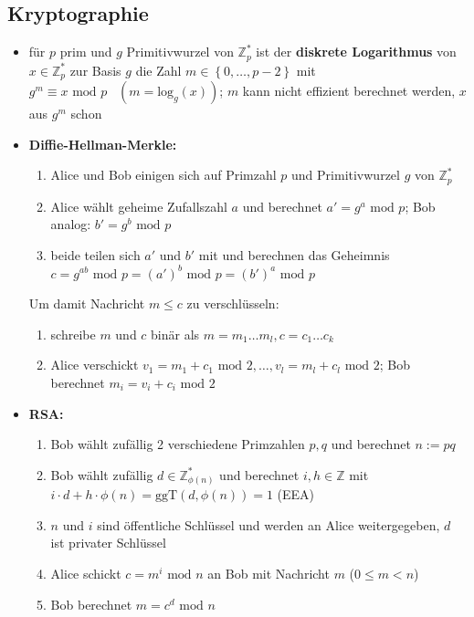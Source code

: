 \documentclass[10pt,a4paper]{article}
\begin{document}
\subsection{Kryptographie}
\begin{itemize}
\item für $p$ prim und $g$ Primitivwurzel von $\mathbb{Z}_{p}^{*}$ ist der \textbf{diskrete Logarithmus} von $x \in \mathbb{Z}_{p}^{*}$ zur Basis $g$ die Zahl $m\in \left\lbrace 0,\dotsc,p-2\right\rbrace$ mit  $g^{m}\equiv x \text{ mod } p\;\;\; (m=\text{log}_{g}(x))$; $m$ kann nicht effizient berechnet werden, $x$ aus $g^{m}$ schon
\item \textbf{Diffie-Hellman-Merkle:}
\begin{enumerate}
\item Alice und Bob einigen sich auf Primzahl $p$ und Primitivwurzel $g$ von $\mathbb{Z}_{p}^{*}$
\item Alice wählt geheime Zufallszahl $a$ und berechnet $a'=g^{a} \text{ mod } p$; Bob analog: $b'=g^{b} \text{ mod } p$
\item beide teilen sich $a'$ und $b'$ mit und berechnen das Geheimnis $c=g^{ab} \text{ mod } p=(a')^{b} \text{ mod } p=(b')^{a} \text{ mod } p$
\end{enumerate}
Um damit Nachricht $m\leq c$ zu verschlüsseln:
\begin{enumerate}
\item  schreibe $m$ und $c$ binär als $m=m_{1}\dotsc m_{l},c=c_{1}\dotsc c_{k}$
\item Alice verschickt $v_{1}=m_{1}+c_{1} \text{ mod } 2,\dotsc,v_{l}=m_{l}+c_{l} \text{ mod } 2$; Bob berechnet $m_{i}=v_{i}+c_{i} \text{ mod } 2$
\end{enumerate}
\item \textbf{RSA:}
\begin{enumerate}
\item Bob wählt zufällig 2 verschiedene Primzahlen $p,q$ und berechnet $n:=pq$
\item Bob wählt zufällig $d\in \mathbb{Z}_{\phi(n)}^{*}$ und berechnet $i,h\in \mathbb{Z}$ mit $ i\cdot d+h\cdot \phi(n)=\text{ggT}(d,\phi(n))=1$ (EEA)


\item $n$ und $i$ sind öffentliche Schlüssel und werden an Alice weitergegeben, $d$ ist privater Schlüssel
\item Alice schickt $c=m^{i} \text{ mod } n$ an Bob mit Nachricht $m$ ($0\leq m <n$) 
\item Bob berechnet $m=c^{d} \text{ mod } n$ 
\end{enumerate}
\end{itemize}
\end{document}
